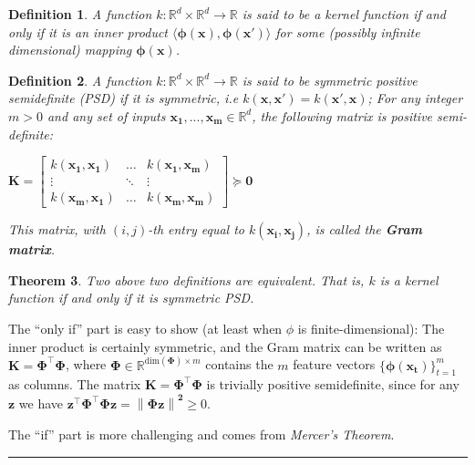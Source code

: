 \documentclass[twoside]{article}
\newcommand{\norm}[1]{\left\lVert #1 \right\rVert}
\newcounter{lecnum}
\newtheorem{theorem}{Theorem}[lecnum]
\newtheorem{definition}[theorem]{Definition}
\newenvironment{proof}{{\bf Proof:}}{\hfill\rule{2mm}{2mm}}
\begin{document}
\begin{definition}
A function $k : \mathbb{R}^d \times \mathbb{R}^d \rightarrow \mathbb{R}$ is said to be a kernel function if and only if it is an inner product $\langle \boldsymbol{\phi(x)}, \boldsymbol{\phi(x')} \rangle$  for some (possibly infinite dimensional) mapping $\boldsymbol{\phi(x)}$.
\end{definition}
\newpage
\begin{definition}
A function $k : \mathbb{R}^d \times \mathbb{R}^d \rightarrow \mathbb{R}$ is said to be symmetric positive semidefinite (PSD) if it is symmetric, i.e \: $k(\boldsymbol{x}, \boldsymbol{x'}) = k(\boldsymbol{x'}, \boldsymbol{x})$; For any integer $m > 0$ and any set of inputs $\boldsymbol{x_1,...,x_m }\in \mathbb{R}^d$, the following matrix is positive semi-definite:
\begin{center}
    $\boldsymbol{K} =
    \begin{bmatrix}
    k(\boldsymbol{x_1}, \boldsymbol{x_1}) & \hdots & k(\boldsymbol{x_1}, \boldsymbol{x_m})\\
    \vdots & \ddots & \vdots\\
    k(\boldsymbol{x_m}, \boldsymbol{x_1}) & \hdots & k(\boldsymbol{x_m}, \boldsymbol{x_m})
    \end{bmatrix}
    \succeq \boldsymbol{0}
$
\end{center}
This matrix, with $(i, j)$-th entry equal to $k(\boldsymbol{x_i}, \boldsymbol{x_j})$, is called the \textbf{Gram matrix}.
\end{definition}

\begin{theorem}
Two above two definitions are equivalent. That is, $k$ is a kernel function if and only if it is symmetric PSD.
\end{theorem}
\begin{proof}
The “only if” part is easy to show (at least when $\phi$ is finite-dimensional): The inner product is certainly symmetric, and the Gram matrix can be written as $\boldsymbol{K = \Phi^\intercal\Phi}$, where $\boldsymbol{\Phi} \in \mathbb{R}^{\text{dim}(\boldsymbol{\Phi}) \times m}$ contains the $m$ feature vectors $\{\boldsymbol{\phi(x_t)}\}_{t = 1}^{m}$ as columns. The matrix $\boldsymbol{K = \Phi^\intercal\Phi}$  is trivially positive semidefinite, since for any $\boldsymbol{z}$ we have $\boldsymbol{z^\intercal\Phi^\intercal\Phi z} = \boldsymbol{\norm{\Phi z}^2} \geq 0$.\medskip

The “if” part is more challenging and comes from \textit{Mercer's Theorem}.
\end{proof}\medskip
\end{document}
